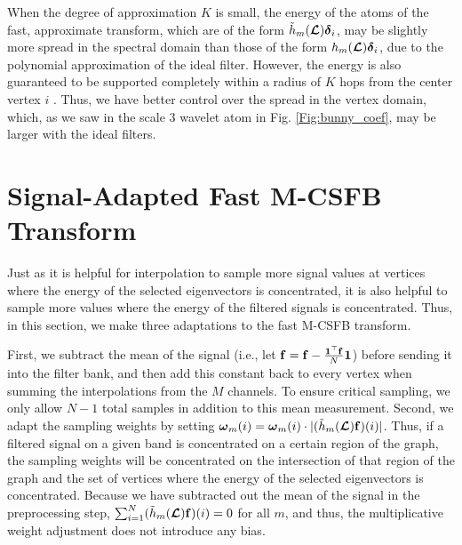 \documentclass[journal, 10pt]{IEEEtran}
\begin{document}
When the degree of approximation $K$ is small, the energy of the atoms of the fast, approximate transform, which are of the form $\tilde{h}_m(\boldsymbol{\mathcal{L}}){\boldsymbol \delta}_i$, may be slightly more spread in the spectral domain than those of the form ${h}_m(\boldsymbol{\mathcal{L}}){\boldsymbol \delta}_i$, due to the polynomial approximation of the ideal filter. However, the energy is also guaranteed to be supported completely within a radius of $K$ hops from the center vertex $i$ \cite{hammond2011wavelets,shuman2015vertex}. Thus, we have better control over the spread in the vertex domain, which, as we saw in the scale 3 wavelet atom in Fig. \ref{Fig:bunny_coef}, may be larger with the ideal filters.



\section{Signal-Adapted Fast M-CSFB Transform} \label{Se:signal_adapted}
Just as it is helpful for interpolation to sample more signal values at vertices where the energy of the selected eigenvectors is concentrated, it is also helpful to sample more values where the energy of the filtered signals is concentrated. Thus, in this section, we make three adaptations to the fast M-CSFB transform. 

First, we subtract the mean of the signal (i.e., let ${\bf f}={\bf f}-\frac{{\bf 1}^{\top}{\bf f}}{N} {\bf 1}$) before sending it into the filter bank, and then add this constant back to every vertex when summing the interpolations from the $M$ channels. To ensure critical sampling, we only allow $N-1$ total samples in addition to this mean measurement. Second, we adapt the sampling weights by setting ${\boldsymbol \omega}_m(i) = {\boldsymbol \omega}_m(i) \cdot |(\tilde{h}_m(\boldsymbol{\mathcal{L}}){\bf f})(i)|$. Thus, if a filtered signal on a given band is concentrated on a certain region of the graph, the sampling weights will be concentrated on the intersection of that region of the graph and the set of vertices where the energy of the selected eigenvectors is concentrated. Because we have subtracted out the mean of the signal in the preprocessing step, $\sum_{i=1}^N (\tilde{h}_m(\boldsymbol{\mathcal{L}}){\bf f})(i)=0$ for all $m$, and thus, the multiplicative weight adjustment does not introduce any bias.
\end{document}
